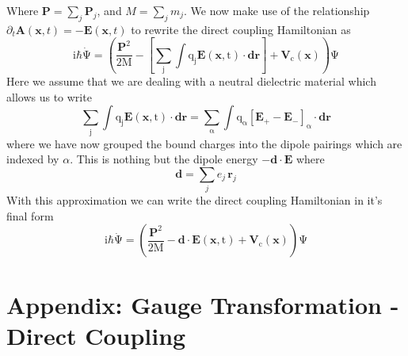 \documentclass[twocolumn,english,pra,aps,superscriptaddress,floatfix]{revtex4-1}
\begin{document}
Where $\mathbf{P}=\sum_j \mathbf{P}_j$, and $M=\sum_j m_j$.  We now make use of the relationship $\partial_t \mathbf{A}(\mathbf{x},t)=-\mathbf{E}(\mathbf{x},t)$ to rewrite the direct coupling Hamiltonian as
\begin{equation}
\mathrm{i\mathrm{\hbar}\dot{\Psi}=\mathrm{\left(\frac{\mathbf{P}^2}{2M}-\left[\sum_j\int q_j\mathbf{E}(\mathbf{x},t) \cdot\mathbf{dr}\right]+\mathbf{V}_c(\mathbf{x})\right)\Psi}}
\end{equation}
Here we assume that we are dealing with a neutral dielectric material which allows us to write
\begin{equation}
\mathrm{\sum_j\int q_j\mathbf{E}(\mathbf{x},t) \cdot\mathbf{dr}=\sum_{\alpha}\int q_{\alpha}\left[\mathbf{E}_{+}-\mathbf{E}_{-}\right]_{\alpha}\cdot\mathbf{dr}}
\end{equation}
where we have now grouped the bound charges into the dipole pairings which are indexed by $\alpha$.  This is nothing but the dipole energy $-\mathbf{d}\cdot\mathbf{E}$    
where
\begin{equation}
\mathbf{d}=\sum_{j} e_j \,\mathbf{r}_j
\end{equation}
With this approximation we can write the direct coupling Hamiltonian in it's final form
\begin{equation}
\mathrm{i\mathrm{\hbar}\dot{\Psi}=\mathrm{\left(\frac{\mathbf{P}^2}{2M}-\mathbf{d}\cdot\mathbf{E}(\mathbf{x},t)+\mathbf{V}_c(\mathbf{x})\right)\Psi}}
\end{equation}


\section{Appendix: Gauge Transformation - Direct Coupling}
\end{document}

